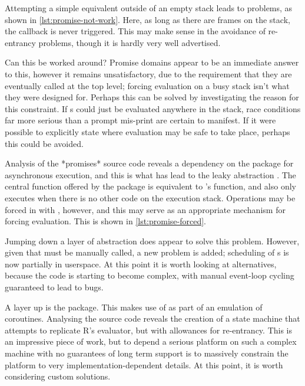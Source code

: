 Attempting a simple equivalent outside of an empty stack leads to problems, as shown in \cref{lst:promise-not-work}.
Here, as long as there are frames on the stack, the  callback is never triggered.
This may make sense in the avoidance of re-entrancy problems, though it is hardly very well advertised.


Can this be worked around?
Promise domains appear to be an immediate answer to this, however it remains unsatisfactory, due to the requirement that they are eventually called at the top level; forcing evaluation on a busy stack isn't what they were designed for.
Perhaps this can be solved by investigating the reason for this constraint.
If s could just be evaluated anywhere in the stack, race conditions far more serious than a prompt mis-print are certain to manifest.
If it were possible to explicitly state where evaluation may be safe to take place, perhaps this could be avoided.

Analysis of the *promises* source code reveals a dependency on the  package for asynchronous execution, and this is what has lead to the leaky abstraction \cite{chang2021later}.
The central  function offered by the package is equivalent to 's  function, and also only executes when there is no other \R{} code on the execution stack.
Operations may be forced in  with , however, and this may serve as an appropriate mechanism for forcing evaluation.
This is shown in \cref{lst:promise-forced}.


Jumping down a layer of abstraction does appear to solve this problem.
However, given that  must be manually called, a new problem is added; scheduling of s is now partially in userspace.
At this point it is worth looking at alternatives, because the code is starting to become complex, with manual event-loop cycling guaranteed to lead to bugs.

A layer up is the  package\cite{henry21coro}.
This makes use of  as part of an emulation of coroutines.
Analysing the source code reveals the creation of a state machine that attempts to replicate R's evaluator, but with allowances for re-entrancy.
This is an impressive piece of work, but to depend a serious platform on such a complex machine with no guarantees of long term support is to massively constrain the platform to very implementation-dependent details.
At this point, it is worth considering custom solutions.


